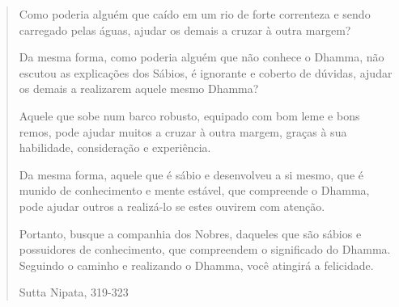 \begin{quote}
Como poderia alguém que caído em um rio de forte correnteza e sendo carregado
pelas águas, ajudar os demais a cruzar à outra margem?

Da mesma forma, como poderia alguém que não conhece o Dhamma, não escutou as
explicações dos Sábios, é ignorante e coberto de dúvidas, ajudar os demais a
realizarem aquele mesmo Dhamma?

Aquele que sobe num barco robusto, equipado com bom leme e bons remos, pode
ajudar muitos a cruzar à outra margem, graças à sua habilidade, consideração e
experiência.

Da mesma forma, aquele que é sábio e desenvolveu a si mesmo, que é munido de
conhecimento e mente estável, que compreende o Dhamma, pode ajudar outros a
realizá-lo se estes ouvirem com atenção.

Portanto, busque a companhia dos Nobres, daqueles que são sábios e possuidores
de conhecimento, que compreendem o significado do Dhamma. Seguindo o caminho e
realizando o Dhamma, você atingirá a felicidade.

Sutta Nipata, 319-323
\end{quote}
